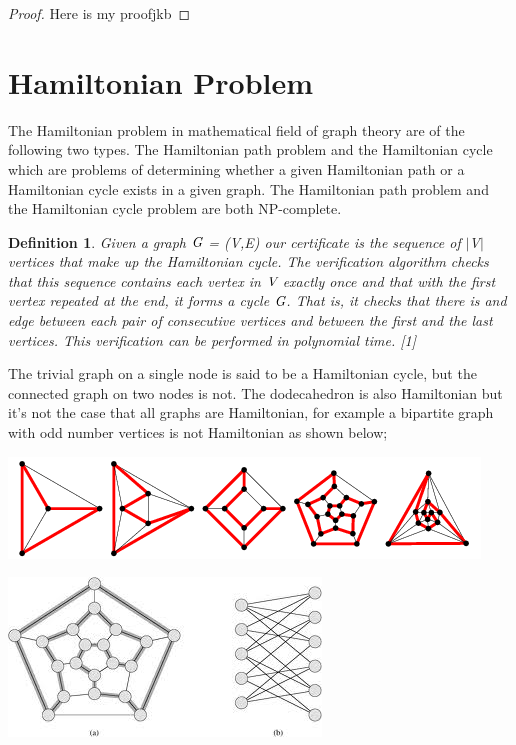 \documentclass[a4paper]{report}
\newtheorem{defi}{Definition}
\newtheorem{proof}{Proof}
\begin{document}
\vspace{3mm}



\begin{proof}
Here is my proofjkb  
\end{proof}



\section{Hamiltonian Problem}

The Hamiltonian problem in mathematical field of graph theory are of the following two types. The Hamiltonian path problem and the Hamiltonian cycle which are problems of determining whether a given Hamiltonian path or a Hamiltonian cycle exists in a given graph. The Hamiltonian path problem and the Hamiltonian cycle problem are both NP-complete. 


\begin{defi}
Given a graph $\emph{G}$ = (V,E) our certificate is the sequence of $\vert$V$\vert$ vertices that make up the Hamiltonian cycle. The verification algorithm checks that this sequence contains each vertex in $\emph{V}$ exactly once and that with the first vertex repeated at the end, it forms a cycle $\emph{G}$. That is, it checks that there is and edge between each pair of consecutive vertices and between the first and the last vertices. This verification can be performed in polynomial time. [1]
\end{defi}

\vspace{3mm}

The trivial graph on a single node is said to be a Hamiltonian cycle, but the connected graph on two nodes is not. The dodecahedron is also Hamiltonian but it's not the case that all graphs are Hamiltonian, for example a bipartite graph with odd number vertices is not Hamiltonian as shown below; 


\begin{center}
\includegraphics[scale=0.80]{Hamiltonian1.png}
\end{center}

\begin{center}
\includegraphics[scale=0.75]{bipartite.png}
\end{center}
\end{document}
